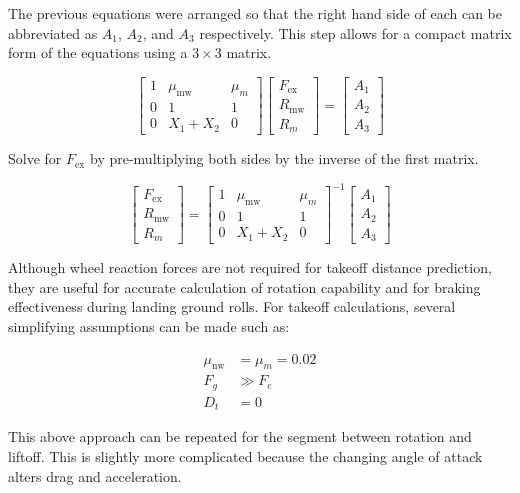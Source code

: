 \documentclass[
]{book}
\begin{document}
The previous equations were arranged so that the right hand side of each can be abbreviated as \(A_1\), \(A_2\), and \(A_3\) respectively.
This step allows for a compact matrix form of the equations using a \(3 \times 3\) matrix.

\[
\begin{bmatrix}
1 & \mu_{\text{mw}} & \mu_m \\
0 & 1 & 1 \\
0 & X_1 + X_2 & 0
\end{bmatrix}
\begin{bmatrix}
F_{\text{ex}} \\
R_{\text{mw}} \\
R_m
\end{bmatrix}
=
\begin{bmatrix}
A_1 \\
A_2 \\
A_3
\end{bmatrix}
\]

Solve for \(F_{\text{ex}}\) by pre-multiplying both sides by the inverse of the first matrix.

\[
\begin{bmatrix}
F_{\text{ex}} \\
R_{\text{mw}} \\
R_m
\end{bmatrix}
=
\begin{bmatrix}
1 & \mu_{\text{mw}} & \mu_m \\
0 & 1 & 1 \\
0 & X_1 + X_2 & 0
\end{bmatrix}^{-1}
\begin{bmatrix}
A_1 \\
A_2 \\
A_3
\end{bmatrix}
\]

Although wheel reaction forces are not required for takeoff distance prediction, they are useful for accurate calculation of rotation capability and for braking effectiveness during landing ground rolls.
For takeoff calculations, several simplifying assumptions can be made such as:

\[
\begin{align}
\mu_{\text{nw}} &= \mu_m = 0.02 \\
F_g &\gg F_e \\
D_t &= 0
\end{align}
\]

This above approach can be repeated for the segment between rotation and liftoff.
This is slightly more complicated because the changing angle of attack alters drag and acceleration.
\end{document}
